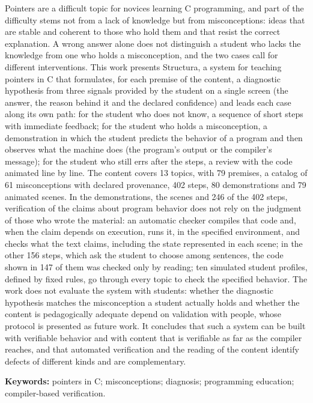 
Pointers are a difficult topic for novices learning C programming, and part of the difficulty stems not from a lack of knowledge but from misconceptions: ideas that are stable and coherent to those who hold them and that resist the correct explanation. A wrong answer alone does not distinguish a student who lacks the knowledge from one who holds a misconception, and the two cases call for different interventions. This work presents Structura, a system for teaching pointers in C that formulates, for each premise of the content, a diagnostic hypothesis from three signals provided by the student on a single screen (the answer, the reason behind it and the declared confidence) and leads each case along its own path: for the student who does not know, a sequence of short steps with immediate feedback; for the student who holds a misconception, a demonstration in which the student predicts the behavior of a program and then observes what the machine does (the program's output or the compiler's message); for the student who still errs after the steps, a review with the code animated line by line. The content covers 13 topics, with 79 premises, a catalog of 61 misconceptions with declared provenance, 402 steps, 80 demonstrations and 79 animated scenes. In the demonstrations, the scenes and 246 of the 402 steps, verification of the claims about program behavior does not rely on the judgment of those who wrote the material: an automatic checker compiles that code and, when the claim depends on execution, runs it, in the specified environment, and checks what the text claims, including the state represented in each scene; in the other 156 steps, which ask the student to choose among sentences, the code shown in 147 of them was checked only by reading; ten simulated student profiles, defined by fixed rules, go through every topic to check the specified behavior. The work does not evaluate the system with students: whether the diagnostic hypothesis matches the misconception a student actually holds and whether the content is pedagogically adequate depend on validation with people, whose protocol is presented as future work. It concludes that such a system can be built with verifiable behavior and with content that is verifiable as far as the compiler reaches, and that automated verification and the reading of the content identify defects of different kinds and are complementary.

\vspace{\onelineskip}
\noindent
\textbf{Keywords:} pointers in C; misconceptions; diagnosis; programming education; compiler-based verification.
